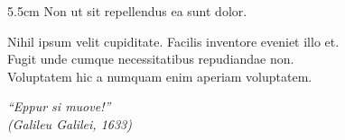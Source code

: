 \documentclass[
	12pt,				%
	oneside,			%
	a4paper,			%
	chapter=TITLE,		%
	section=TITLE,		%
	english,			%
	brazil				%
	]{abntex2}
\begin{document}
\begin{folhadeaprovacao}
	\vspace*{\fill}
	\centering
\end{folhadeaprovacao}

\begin{dedicatoria}
	\vspace*{\fill}
	\noindent
	\begin{adjustwidth*}{}{5.5cm}
		\raggedleft
		Non ut sit repellendus ea sunt dolor.
	\end{adjustwidth*}
\end{dedicatoria}

\begin{agradecimentos}
	Nihil ipsum velit cupiditate. Facilis inventore eveniet illo et.\\
Fugit unde cumque necessitatibus repudiandae non.\\
Voluptatem hic a numquam enim aperiam voluptatem.
\end{agradecimentos}

\begin{epigrafe}
	\vspace*{\fill}
	\begin{flushright}
		\textit{``Eppur si muove!''\\
(Galileu Galilei, 1633)}
	\end{flushright}
\end{epigrafe}
\end{document}

